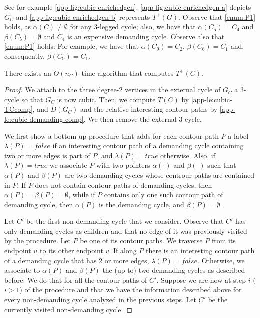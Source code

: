 \documentclass[runningheads]{llncs}
\begin{document}
See for example \cref{app-fig:cubic-enrichedgen}. \cref{app-fig:cubic-enrichedgen-a} depicts $G_C$ and \cref{app-fig:cubic-enrichedgen-b} represents $T^+(G)$.  Observe that \ref{enum:P1} holds, as $\alpha(C)\not= \emptyset$ for any 3-legged cycle; also, we have that $\alpha(C_5)=C_4$ and $\beta(C_5)=\emptyset$ and $C_4$ is an expensive demanding cycle. Observe also that \ref{enum:P1} holds: For example, we have that $\alpha(C_9)=C_2$, $\beta(C_6)=C_1$ and, consequently, $\beta(C_9)=C_1$.

\begin{lemma}
  \label{app-le:cubic_TpC}
  There exists an $O(n_C)$-time algorithm that computes $T^+(C)$.
\end{lemma}

\begin{proof}  
We attach to the three degree-2 vertices in the external cycle of $G_C$ a 3-cycle so that $G_C$ is now cubic. Then, we compute $T(C)$ by \cref{app-le:cubic-TCcomp}, and $D(G_C)$ and the relative interesting contour paths by \cref{app-le:cubic-demanding-comp}. We then remove the external 3-cycle.

We first show a bottom-up procedure that adds for each contour path $P$ a label $\lambda(P)=\mathit{false}$ 
if an interesting contour path of a demanding cycle containing two or more edges is part of $P$, and $\lambda(P)=\mathit{true}$ otherwise. Also, if $\lambda(P)=\mathit{true}$ we associate $P$ with two pointers $\alpha(\cdot)$ and $\beta(\cdot)$ such that $\alpha(P)$ and $\beta(P)$ are two demanding cycles whose controur paths are contained in $P$. If $P$ does not contain contour paths of demanding cycles, then $\alpha(P)=\beta(P)=\emptyset$, while if $P$ contains only one such contour path of demanding cycle, then $\alpha(P)$ is the demanding cycle, and $\beta(P)=\emptyset$. 

Let $C'$ be the first non-demanding cycle that we consider. Observe that $C'$ has only demanding cycles as children and that no edge of it was previously visited by the procedure. Let $P$ be one of its contour paths. We traverse $P$ from its endpoint $u$ to its other endpoint $v$. If along $P$ there is an interesting contour path of a demanding cycle that has 2 or more edges, $\lambda(P)=\mathit{false}$. Otherwise, we associate to $\alpha(P)$ and $\beta(P)$ the (up to) two demanding cycles as described before. We do that for all the contour paths of $C'$. Suppose we are now at step $i$ ($i>1$) of the procedure and that we have the information described above for every non-demanding cycle analyzed in the previous steps. Let $C'$ be the currently visited non-demanding cycle. 


\end{proof}
\end{document}
